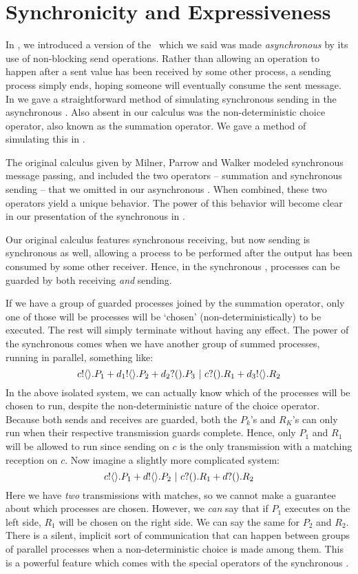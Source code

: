 \chapter{Synchronicity and Expressiveness}\label{sync_and_express}
In , we introduced a version of the \picalc\ which we said was made \emph{asynchronous} by its use of non-blocking send operations.  Rather than allowing an operation to happen after a sent value has been received by some other process, a sending process simply ends, hoping someone will eventually consume the sent message.  In  we gave a straightforward method of simulating synchronous sending in the asynchronous \picalc.  Also absent in our calculus was the non-deterministic choice operator, also known as the summation operator.  We gave a method of simulating this in .

The original calculus given by Milner, Parrow and Walker modeled synchronous message passing, and included the two operators -- summation and synchronous sending -- that we omitted in our asynchronous \picalc.  When combined, these two operators yield a unique behavior.  The power of this behavior will become clear in our presentation of the synchronous \picalc in .

Our original calculus features synchronous receiving, but now sending is synchronous as well, allowing a process to be performed after the output has been consumed by some other receiver.  Hence, in the synchronous \picalc, processes can be guarded by both receiving \emph{and} sending.  

If we have a group of guarded processes joined by the summation operator, only one of those will be processes will be `chosen' (non-deterministically) to be executed.  The rest will simply terminate without having any effect.  The power of the synchronous \picalc comes when we have another group of summed processes, running in parallel, something like: 
\[
	{c}!\langle{}\rangle.P_1 + {d_1}!\langle{}\rangle.P_2 + {d_2}?({}).P_3 \ |\  {c}?({}).R_1 + {d_3}!\langle{}\rangle.R_2
\]
In the above isolated system, we can actually know which of the processes will be chosen to run, despite the non-deterministic nature of the choice operator.  Because both sends and receives are guarded, both the $P_k$'s and $R_K$'s can only run when their respective transmission guards complete.  Hence, only $P_1$ and $R_1$ will be allowed to run since sending on $c$ is the only transmission with a matching reception on $c$.  Now imagine a slightly more complicated system:
\[
	{c}!\langle{}\rangle.P_1 + {d}!\langle{}\rangle.P_2 \ |\  {c}?({}).R_1 + {d}?({}).R_2
\]
Here we have \emph{two} transmissions with matches, so we cannot make a guarantee about which processes are chosen.  However, we \emph{can} say that if $P_1$ executes on the left side, $R_1$ will be chosen on the right side.  We can say the same for $P_2$ and $R_2$.  There is a silent, implicit sort of communication that can happen between groups of parallel processes when a non-deterministic choice is made among them.  This is a powerful feature which comes with the special operators of the synchronous \picalc.

